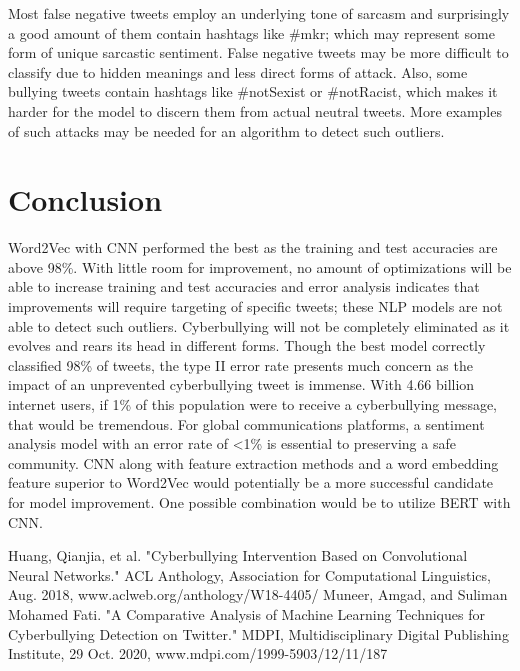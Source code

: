 \documentclass[conference]{IEEEtran}
\begin{document}
Most false negative tweets employ an underlying tone of sarcasm and surprisingly a good amount of them contain hashtags like \#mkr; which may represent some form of unique sarcastic sentiment. False negative tweets may be more difficult to classify due to hidden meanings and less direct forms of attack. Also, some bullying tweets contain hashtags like \#notSexist or \#notRacist, which makes it harder for the model to discern them from actual neutral tweets. More examples of such attacks may be needed for an algorithm to detect such outliers.

\section{Conclusion}

Word2Vec with CNN performed the best as the training and test accuracies are above 98\%. With little room for improvement, no amount of optimizations will be able to increase training and test accuracies and error analysis indicates that improvements will require targeting of specific tweets; these NLP models are not able to detect such outliers.
	Cyberbullying will not be completely eliminated as it evolves and rears its head in different forms. Though the best model correctly classified 98\% of tweets, the type II error rate presents much concern as the impact of an unprevented cyberbullying tweet is immense. With 4.66 billion internet users, if 1\% of this population were to receive a cyberbullying message, that would be tremendous. For global communications platforms, a sentiment analysis model with an error rate of  <1\% is essential to preserving a safe community. CNN along with feature extraction methods and a word embedding feature superior to Word2Vec would potentially be a more successful candidate for model improvement. One possible combination would be to utilize BERT with CNN.


\begin{thebibliography}{00}
 Huang, Qianjia, et al. "Cyberbullying Intervention Based on Convolutional Neural Networks." ACL Anthology, Association for Computational Linguistics, Aug. 2018, www.aclweb.org/anthology/W18-4405/
 Muneer, Amgad, and Suliman Mohamed Fati. "A Comparative Analysis of Machine Learning Techniques for Cyberbullying Detection on Twitter." MDPI, Multidisciplinary Digital Publishing Institute, 29 Oct. 2020, www.mdpi.com/1999-5903/12/11/187
\end{thebibliography}
\vspace{12pt}
\end{document}
